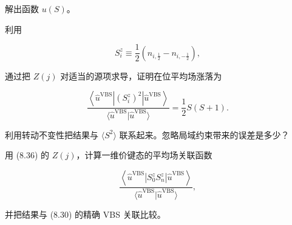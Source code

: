 \begin{exercises}
解出函数 $u(S)$。

\item 利用

\begin{equation*}
S _ {i} ^ {z} \equiv \frac {1}{2} \left( n _ {i, \frac {1}{2}} - n _ {i, - \frac {1}{2}} \right),
\tag{8.40}
\end{equation*}

通过把 $Z(j)$ 对适当的源项求导，证明在位平均场涨落为

\begin{equation*}
\frac {\left\langle \hat {u} ^ {\mathrm{VBS}} \left| \left( S _ {i} ^ {z} \right) ^ {2} \right| \hat {u} ^ {\mathrm{VBS}} \right\rangle}{\langle \hat {u} ^ {\mathrm{VBS}} | \hat {u} ^ {\mathrm{VBS}} \rangle} = \frac {1}{2} S ( S + 1 ).
\tag{8.41}
\end{equation*}

利用转动不变性把结果与 $\langle S^{2}\rangle$ 联系起来。忽略局域约束带来的误差是多少？

\item 用 (8.36) 的 $Z(j)$，计算一维价键态的平均场关联函数

\begin{equation*}
\frac {\left\langle \hat {u} ^ {\mathrm{VBS}} \left| S _ {0} ^ {z} S _ {n} ^ {z} \right| \hat {u} ^ {\mathrm{VBS}} \right\rangle}{\langle \hat {u} ^ {\mathrm{VBS}} | \hat {u} ^ {\mathrm{VBS}} \rangle} ,
\tag{8.42}
\end{equation*}

并把结果与 (8.30) 的精确 VBS 关联比较。

\end{exercises}

